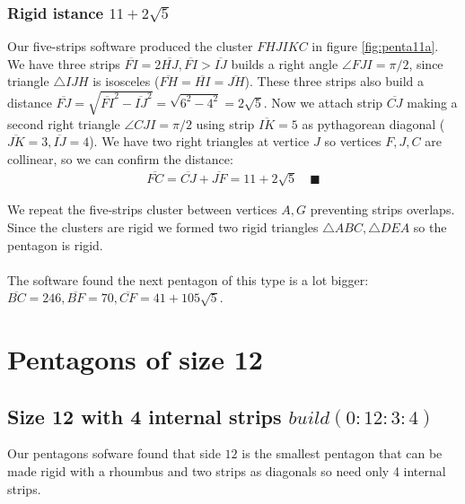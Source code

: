 \documentclass[11pt]{article}
\begin{document}
\subsubsection{Rigid istance $11+2\sqrt{5}$}

Our five-strips software produced the cluster $FHJIKC$ in figure \ref{fig:penta11a}. We have three strips $\overline{FI} = 2\overline{HJ}, \overline{FI} > \overline{IJ}$ builds a right angle $\angle{FJI} = \pi/2$, since triangle $\triangle{IJH}$ is isosceles ($\overline{FH} = \overline{HI} = \overline{JH}$). These three strips also build a distance $\overline{FJ} = \sqrt{\overline{FI}^2 - \overline{IJ}^2} = \sqrt{6^2 - 4^2} = 2\sqrt5$. Now we attach strip $\overline{CJ}$ making a second right triangle $\angle{CJI} = \pi/2$ using strip $\overline{IK}=5$ as pythagorean diagonal ($\overline{JK}=3, \overline{IJ}=4$). We have two right triangles at vertice $J$ so vertices $F,J,C$ are collinear, so we can confirm the distance:
\begin{align}
\overline{FC} = \overline{CJ} + \overline{JF} = 11 + 2\sqrt5 \quad\blacksquare
\end{align} 

We repeat the five-strips cluster between vertices $A,G$ preventing strips overlaps. Since the clusters are rigid we formed two rigid triangles $\triangle{ABC}, \triangle{DEA}$ so the pentagon is rigid.
\\\\
The software found the next pentagon of this type is a lot bigger: $\overline{BC}=246, \overline{BF}=70, \overline{CF}=41+105\sqrt5$.




\section{Pentagons of size 12}

\subsection{Size 12 with 4 internal strips $build(0:12:3:4)$}

Our pentagons sofware found that side $12$ is the smallest pentagon that can be made rigid with a rhoumbus and two strips as diagonals so need only 4 internal strips.
\end{document}
